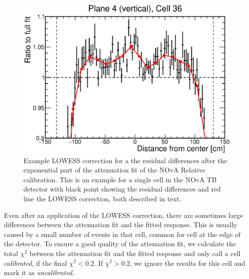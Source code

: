 \begin{figure}
    \centering
    \includegraphics[width=.7\textwidth]{Plots/NOvAExperiment/ExampleLOWESSFit.eps}
    \caption[Example LOWESS correction for NOvA Relative calibration]{Example \acrshort{LOWESS} correction for a the residual differences after the exponential part of the attenuation fit of the \acrshort{NOvA} Relative calibration. This is an example for a single cell in the \acrshort{NOvA} \acrshort{TB} detector with black point showing the residual differences and red line the \acrshort{LOWESS} correction, both described in text.}
    \label{fig:NOvACalibrationLOWESSCorrection}
\end{figure}

Even after an application of the \gls{LOWESS} correction, there are sometimes large differences between the attenuation fit and the fitted response. This is usually caused by a small number of events in that cell, common for cell at the edge of the detector. To ensure a good quality of the attenuation fit, we calculate the total $\chi^2$ between the attenuation fit and the fitted response and only call a cell \textit{calibrated}, if the final $\chi^2<0.2$. If $\chi^2>0.2$, we ignore the results for this cell and mark it as \textit{uncalibrated}.



